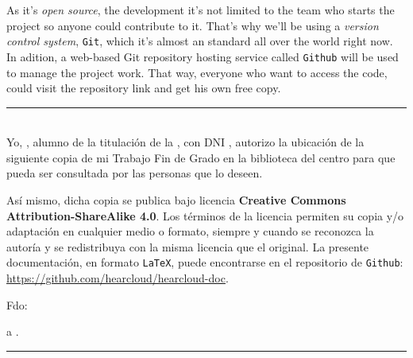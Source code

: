 As it's \textit{open source}, the development it's not limited to the team who starts the project so anyone could contribute to it. That's why we'll be using a \textit{version control system}, {\tt Git}, which it's almost an standard all over the world right now. In adition, a web-based Git repository hosting service called {\tt Github} will be used to manage the project work. That way, everyone who want to access the code, could visit the repository link and get his own free copy. \\

\newpage

\thispagestyle{empty}
\noindent\rule[-1ex]{\textwidth}{2pt}\\[4.5ex]

Yo, \textbf{\myName}, alumno de la titulación \myDegree{} de la \textbf{\myFaculty}, con DNI \myDNI, autorizo la ubicación de la siguiente copia de mi Trabajo Fin de Grado en la biblioteca del centro para que pueda ser consultada por las personas que lo deseen. \bigskip

Así mismo, dicha copia se publica bajo licencia \textbf{Creative Commons Attribution-ShareAlike 4.0}. Los términos de la licencia permiten su copia y/o adaptación en cualquier medio o formato, siempre y cuando se reconozca la autoría y se redistribuya con la misma licencia que el original. La presente documentación, en formato {\tt LaTeX}, puede encontrarse en el repositorio de {\tt Github}: \url{https://github.com/hearcloud/hearcloud-doc}.

\vspace{6cm}

\noindent Fdo: \myName

\vspace{2cm}

\begin{flushright}
\myLocation a \myTime.
\end{flushright}

\newpage


\thispagestyle{empty}
\noindent\rule[-1ex]{\textwidth}{2pt}\\[4.5ex]


